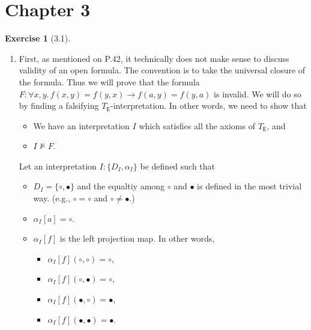 \documentclass[12pt, psamsfonts]{amsart}
\theoremstyle{definition}
\newtheorem*{exer}{Exercise}
\theoremstyle{remark}
\numberwithin{equation}{subsection}
\begin{document}
\section{Chapter 3}
\begin{exer}[3.1]
    $ $
    \begin{enumerate}[label=(\alph*)]
        \item
            First, as mentioned on P.42, it technically does not make sense to discuss validity of an open formula.
            The convention is to take the universal closure of the formula.
            Thus we will prove that the formula $F: \forall x, y.\, f(x, y) = f(y, x) \rightarrow f(a, y) = f(y, a)$ is invalid.
            We will do so by finding a falsifying $T_{\textsf{E}}$-interpretation.
            In other words, we need to show that
            \begin{itemize}
                \item
                    We have an interpretation $I$ which satisfies all the axioms of $T_{\textsf{E}}$, and
                \item
                    $I \not\models F$.
            \end{itemize}
            Let an interpretation $I: \{ D_I, \alpha_I \}$ be defined such that
            \begin{itemize}
                \item
                    $D_I = \{ \circ, \bullet \}$ and the equaltiy among $\circ$ and $\bullet$ is defined in the most trivial way.
                    (e.g., $\circ = \circ$ and $\circ \ne \bullet$.)
                \item
                    $\alpha_I[a] = \circ$.
                \item
                    $\alpha_I[f]$ is the left projection map.
                    In other words,
                    \begin{itemize}
                        \item
                            $\alpha_I[f](\circ, \circ) = \circ$,
                        \item
                            $\alpha_I[f](\circ, \bullet) = \circ$,
                        \item
                            $\alpha_I[f](\bullet, \circ) = \bullet$,
                        \item
                            $\alpha_I[f](\bullet, \bullet) = \bullet$.
                    \end{itemize}

\end{itemize}
\end{enumerate}
\end{exer}
\end{document}
